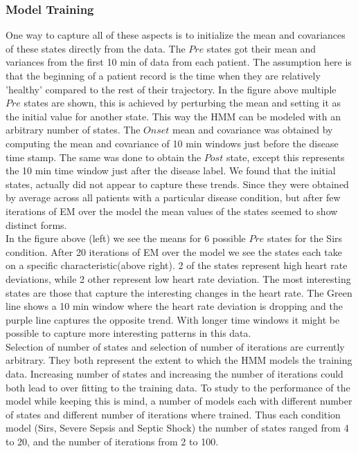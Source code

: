 \documentclass[12pt,solutions]{article}
\begin{document}
\subsubsection{Model Training}
One way to capture all of these aspects is to initialize the mean and covariances of these states directly from the data. The $Pre$ states got their mean and variances from the first 10 min of data from each patient. The assumption here is that the beginning of a patient record is the time when they are relatively 'healthy' compared to the rest of their trajectory. In the figure above multiple $Pre$ states are shown, this is achieved by  perturbing the mean and setting it as the initial value for another state. This way the HMM can be modeled with an arbitrary number of states. The $Onset$ mean and covariance was obtained by computing the mean and covariance of 10 min windows just before the disease time stamp. The same was done to obtain the $Post$ state, except this represents the 10 min time window just after the disease label. We found that the initial states, actually did not appear to capture these trends. Since they were obtained by average across all patients with a particular disease condition, but after few iterations of EM over the model the mean values of the states seemed to show distinct forms.\\

In the figure above (left) we see the means for 6 possible $Pre$ states for the Sirs condition. After 20 iterations of EM over the model we see the states each take on a specific characteristic(above right). 2 of the states represent high heart rate deviations, while 2 other represent low heart rate deviation. The most interesting states are those that capture the interesting changes in the heart rate. The Green line shows a 10 min window where the heart rate deviation is dropping and the purple line captures the opposite trend. With longer time windows it might be possible to capture more interesting patterns in this data.\\

Selection of number of states and selection of number of iterations are currently arbitrary. They both represent the extent to which the HMM models the training data. Increasing number of states and increasing the number of iterations could both lead to over fitting to the training data. To study to the performance of the model while keeping this is mind, a number of models each with different number of states and different number of iterations where trained. Thus each condition model (Sirs, Severe Sepsis and Septic Shock) 
the number of states ranged from 4 to 20, and the number of iterations from 2 to 100. 
\end{document}
